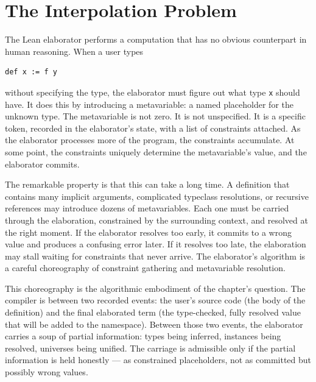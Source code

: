 \chapter{The Interpolation Problem}
\label{chap:interpolation-problem}


\begin{chapteressay}

The Lean elaborator performs a computation that has no obvious counterpart
in human reasoning. When a user types
\begin{verbatim}
def x := f y
\end{verbatim}
without specifying the type, the elaborator must figure out what type
\texttt{x} should have. It does this by introducing a metavariable: a
named placeholder for the unknown type. The metavariable is not zero. It
is not unspecified. It is a specific token, recorded in the elaborator's
state, with a list of constraints attached. As the elaborator processes
more of the program, the constraints accumulate. At some point, the
constraints uniquely determine the metavariable's value, and the
elaborator commits.

The remarkable property is that this can take a long time. A definition
that contains many implicit arguments, complicated typeclass resolutions,
or recursive references may introduce dozens of metavariables. Each one
must be carried through the elaboration, constrained by the surrounding
context, and resolved at the right moment. If the elaborator resolves
too early, it commits to a wrong value and produces a confusing error
later. If it resolves too late, the elaboration may stall waiting for
constraints that never arrive. The elaborator's algorithm is a careful
choreography of constraint gathering and metavariable resolution.

This choreography is the algorithmic embodiment of the chapter's
question. The compiler is between two recorded events: the user's
source code (the body of the definition) and the final elaborated
term (the type-checked, fully resolved value that will be added to
the namespace). Between those two events, the elaborator carries a
soup of partial information: types being inferred, instances being
resolved, universes being unified. The carriage is admissible only if
the partial information is held honestly --- as constrained
placeholders, not as committed but possibly wrong values.


\end{chapteressay}
